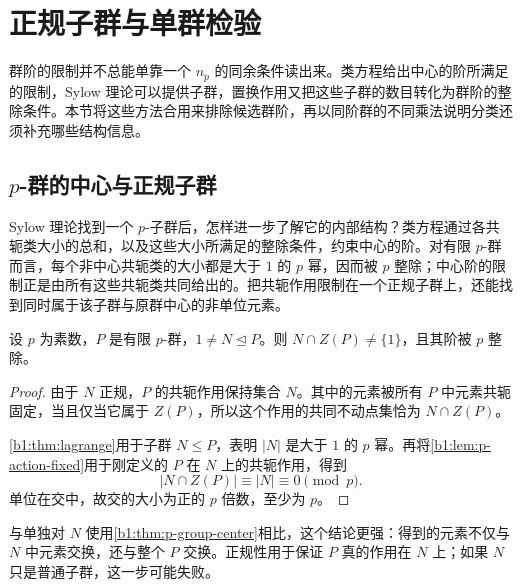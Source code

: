 
\section{正规子群与单群检验}
\label{b1:sec:0504}

群阶的限制并不总能单靠一个 \(n_p\) 的同余条件读出来。类方程给出中心的阶所满足的限制，Sylow 理论可以提供子群，置换作用又把这些子群的数目转化为群阶的整除条件。本节将这些方法合用来排除候选群阶，再以同阶群的不同乘法说明分类还须补充哪些结构信息。


%
%
%

\subsection{\texorpdfstring{\(p\)}{p}-群的中心与正规子群}
\label{b1:subsec:0504:01}

Sylow 理论找到一个 \(p\)-子群后，怎样进一步了解它的内部结构？类方程通过各共轭类大小的总和，以及这些大小所满足的整除条件，约束中心的阶。对有限 \(p\)-群而言，每个非中心共轭类的大小都是大于 \(1\) 的 \(p\) 幂，因而被 \(p\) 整除；中心阶的限制正是由所有这些共轭类共同给出的。把共轭作用限制在一个正规子群上，还能找到同时属于该子群与原群中心的非单位元素。

\begin{proposition}[非平凡正规子群与中心相交]\label{b1:prop:normal-subgroup-p-center}
	设 \(p\) 为素数，\(P\) 是有限 \(p\)-群，\(1\neq N\trianglelefteq P\)。则 \(N\cap Z(P)\neq\{1\}\)，且其阶被 \(p\) 整除。
\end{proposition}
\begin{proof}
	由于 \(N\) 正规，\(P\) 的共轭作用保持集合 \(N\)。其中的元素被所有 \(P\) 中元素共轭固定，当且仅当它属于 \(Z(P)\)，所以这个作用的共同不动点集恰为 \(N\cap Z(P)\)。

	\cref{b1:thm:lagrange}用于子群 \(N\leq P\)，表明 \(|N|\) 是大于 \(1\) 的 \(p\) 幂。再将\cref{b1:lem:p-action-fixed}用于刚定义的 \(P\) 在 \(N\) 上的共轭作用，得到
	\[
		\bigl|N\cap Z(P)\bigr|\equiv|N|\equiv0\pmod p.
	\]
	单位在交中，故交的大小为正的 \(p\) 倍数，至少为 \(p\)。
\end{proof}

与单独对 \(N\) 使用\cref{b1:thm:p-group-center}相比，这个结论更强：得到的元素不仅与 \(N\) 中元素交换，还与整个 \(P\) 交换。正规性用于保证 \(P\) 真的作用在 \(N\) 上；如果 \(N\) 只是普通子群，这一步可能失败。

